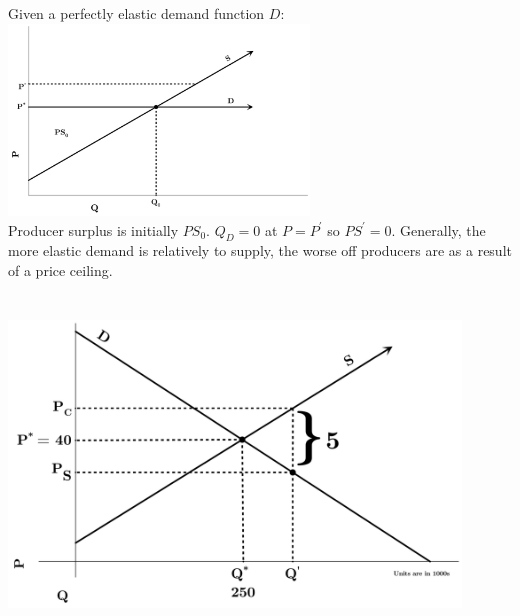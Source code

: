 \documentclass{article}
\begin{document}
	\subsection[c]{}
		Given a perfectly elastic demand function $D$: \\
		\includegraphics[height=2in]{Charts/1c} \\
		Producer surplus is initially ${PS}_0$. $Q_D = 0$ at $ P = P^{'}$ so ${PS}^{'} = 0.$ Generally, the more elastic demand is relatively to supply, the worse off producers are as a result of a price ceiling.
\section[2]{}
	\subsection[a]{}
		\includegraphics[height=3in]{Charts/2a}
\end{document}
